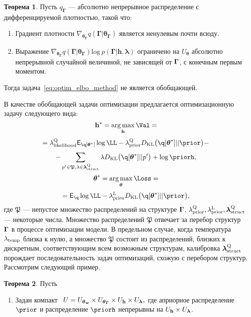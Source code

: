 \documentclass[11pt, a5paper]{dissert}
\theoremstyle{definition}
\newtheorem{theorem}{Теорема}
\DeclareMathOperator*{\argmax}{arg\,max}
\begin{document}
{\begin{theorem}
Пусть $q_{\boldsymbol{\Gamma}}$ --- абсолютно непрерывное распределение с дифференцируемой плотностью, такой что:
\begin{enumerate}
\item Градиент плотности $\nabla_{\boldsymbol{\theta}_{\boldsymbol{\Gamma}}} q(\boldsymbol{\Gamma}|\boldsymbol{\theta}_{\boldsymbol{\Gamma}})$ является ненулевым почти всюду.
\item Выражение $\nabla_{\boldsymbol{\theta}_{\boldsymbol{\Gamma}}} q(\boldsymbol{\Gamma}|\boldsymbol{\theta}_{\boldsymbol{\Gamma}}) \text{log}~p(\boldsymbol{\Gamma}|\mathbf{h}, \boldsymbol{\lambda})$ ограничено на $U_{\boldsymbol{\theta}}$ абсолютно непрерывной случайной величиной, не зависящей от $\boldsymbol{\Gamma}$, с конечным первым моментом.
\end{enumerate}
Тогда задача~\eqref{eq:optim_elbo_method} не является обобщающей.
\end{theorem}


В качестве обобщающей задачи оптимизации предлагается оптимизационную задачу следующего вида:
\begin{equation}
\label{eq:qopt}
\h^{*} = \argmax_{\h} \Val = 
\end{equation}
\[
= \lamLL \E_{\q[\teta^{*}]} \log\LL - \lamCQ \KL{\q[\teta^{*}]}{\prior} -
\]
\[
    - \sum_{p' \in \mathfrak{P},\lambda \in \lamS} \lambda\KL{\q[\teta^{*}]}{p'} + \log\priorh, 
\]
\begin{equation}
\label{eq:lopt}
{\teta}^{*} = \argmax_{\teta} \Loss = 
\end{equation}
\[=
\E_{\q} \log \LL - \lamCL \KL{\q[\teta^{*}]}{\prior},
\]
где $\mathfrak{P}$ --- непустое множество распределений на структуре $\boldsymbol{\Gamma}$, $\lambda_\text{prior}^\text{Q}, \lambda_\text{prior}^\text{L}, \boldsymbol{\lambda}_\text{struct}^\text{Q}$  --- некоторые числа. Множество распределений $\mathfrak{P}$ отвечает за перебор структур $\boldsymbol{\Gamma}$ в процессе оптимизации модели.
В предельном случае, когда температура $\lambda_{\text{temp}}$ близка к нулю, а множество $\mathfrak{P}$ состоит из распределений, близких к дискретным, соответствующим всем возможным структурам, калибровка $\boldsymbol{\lambda}_\text{struct}^\text{Q}$ порождает последовательность задач оптимизаций, схожую с перебором структур. Рассмотрим следующий пример. 

\begin{theorem}
Пусть
\begin{enumerate}%

\item Задан компакт  $U = U_{\boldsymbol{\theta}_\mathbf{w}} \times U_{\boldsymbol{\theta}_{\boldsymbol{\Gamma}}} \times U_{\mathbf{h}} \times U_{\boldsymbol{\lambda}},$ где априорное распределение $\prior$ и распределение $\priorh$ непрерывны на $U_{\mathbf{h}} \times U_{\boldsymbol{\lambda}}$.


\end{enumerate}
\end{theorem}}
\end{document}
